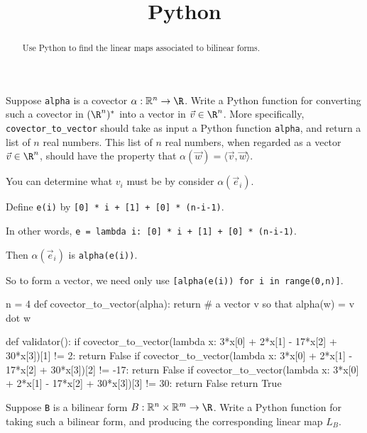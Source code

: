 \documentclass{ximera}
\title{Python}
\begin{document}
\begin{abstract}
  Use Python to find the linear maps associated to bilinear forms.
\end{abstract}	

\begin{question}
  Suppose \texttt{alpha} is a covector $\alpha : \mathbb{R}^n \to \R$.  Write a Python function for converting such a covector in $(\R^n)^*$ into a vector in $\vec{v} \in \R^n$.  More specifically, \texttt{covector\_to\_vector} should take as input a Python function \texttt{alpha}, and return a list of $n$ real numbers.  This list of $n$ real numbers, when regarded as a vector $\vec{v} \in \R^n$, should have the property that $\alpha(\vec{w}) = \langle \vec{v}, \vec{w} \rangle$.

  \begin{solution}
    \begin{hint}
      You can determine what $v_i$ must be by consider $\alpha(\vec{e}_i)$.
    \end{hint}
    \begin{hint}
      Define \texttt{e(i)} by \texttt{[0] * i + [1] + [0] * (n-i-1)}.
    \end{hint}
    \begin{hint}
      In other words, \texttt{e = lambda i: [0] * i + [1] + [0] * (n-i-1)}.
    \end{hint}
    \begin{hint}
      Then $\alpha(\vec{e}_i)$ is \texttt{alpha(e(i))}.
    \end{hint}
    \begin{hint}
      So to form a vector, we need only use \texttt{[alpha(e(i)) for i in range(0,n)]}.
    \end{hint}
    \begin{python}
n = 4
def covector_to_vector(alpha):
  return # a vector v so that alpha(w) = v dot w

def validator():
  if covector_to_vector(lambda x: 3*x[0] + 2*x[1] - 17*x[2] + 30*x[3])[1] != 2:
    return False
  if covector_to_vector(lambda x: 3*x[0] + 2*x[1] - 17*x[2] + 30*x[3])[2] != -17:
    return False
  if covector_to_vector(lambda x: 3*x[0] + 2*x[1] - 17*x[2] + 30*x[3])[3] != 30:
    return False
  return True
    \end{python}
  \end{solution}

  Suppose \texttt{B} is a bilinear form $B : \mathbb{R}^n \times \mathbb{R}^m \to \R$.  Write a Python function for taking such a bilinear form, and producing the corresponding linear map $L_B$.


\end{question}
\end{document}
